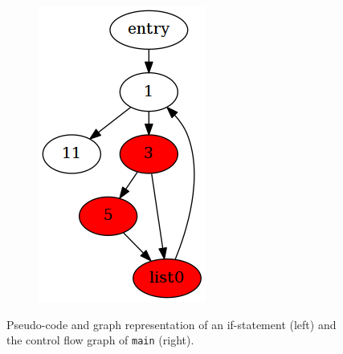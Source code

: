 \documentclass[a2paper,landscape,fontscale=0.35]{baposter}
\begin{document}
\begin{poster}
{\begin{figure}[H]
\begin{subfigure}[ht]{0.50\textwidth}
			\includegraphics[width=\textwidth]{inc/foo.png}
		\end{subfigure}
		\caption{Pseudo-code and graph representation of an if-statement (left) and the control flow graph of \texttt{main} (right).}
	\end{figure}
}

{
	\setlength{\intextsep}{0pt}
	\setlength{\abovecaptionskip}{0pt}

}
\end{poster}
\end{document}
